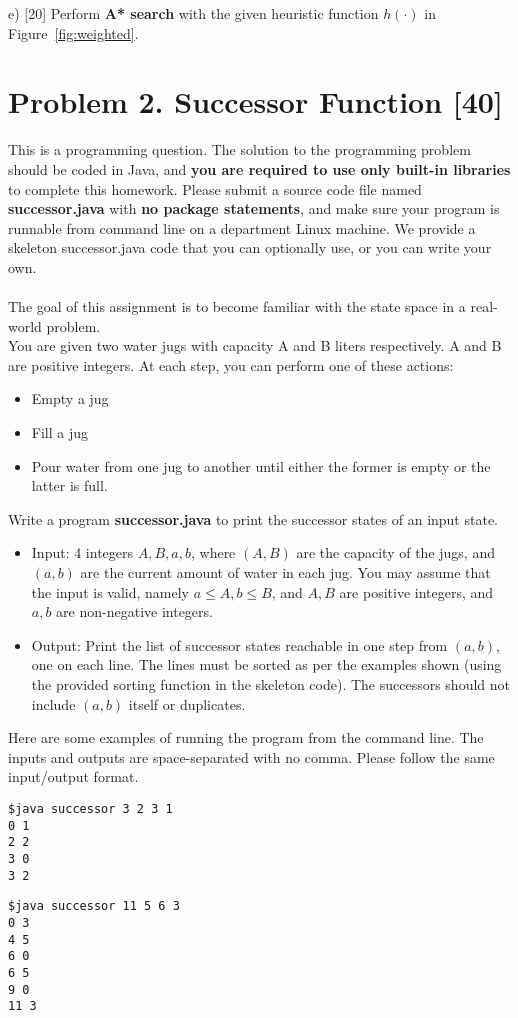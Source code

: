 \documentclass[10pt,a4paper]{article}
\begin{document}
\noindent e) [20] Perform \textbf{A* search} with the given heuristic function $h(\cdot)$ in Figure~\ref{fig:weighted}.


\newpage

\section*{Problem 2. Successor Function [40]}
This is a programming question. The solution to the programming problem should be coded in Java, and
\textbf{you are required to use only built-in libraries} to complete this homework. Please submit a source code file named \textbf{successor.java} with \textbf{no package statements}, and make sure your program is runnable from command line on a department Linux machine. We provide a skeleton successor.java code that you can optionally use, or you can write your own. \\ \\
The goal of this assignment is to become familiar with the state space in a real-world problem. \\
You are given two water jugs with capacity A and B liters respectively. A and B are positive integers. At each step, you can perform one of these actions:
\begin{itemize}
 \setlength{\topsep}{0pt}
 \setlength{\itemsep}{0pt}
 \setlength{\parskip}{0pt}
 \setlength{\parsep}{0pt}
 \item Empty a jug
 \item Fill a jug
 \item Pour water from one jug to another until either the former is empty or the latter is full.
\end{itemize}

\noindent Write a program \textbf{successor.java} to print the successor states of an input state.
\begin{itemize}
 \setlength{\topsep}{0pt}
 \setlength{\itemsep}{0pt}
 \setlength{\parskip}{0pt}
 \setlength{\parsep}{0pt}
 \item Input: 4 integers $A, B, a, b$, where $(A, B)$ are the capacity of the jugs, and $(a, b)$ are the current amount of water in each jug.  You may assume that the input is valid, namely $a\le A, b\le B$, and $A, B$ are positive integers, and $a, b$ are non-negative integers.   
 \item Output: Print the list of successor states reachable in one step from $(a,b)$, one on each line.  The lines must be sorted as per the examples shown (using the provided sorting function in the skeleton code).  The successors should not include $(a,b)$ itself or duplicates.
\end{itemize}

Here are some examples of running the program from the command line.
The inputs and outputs are space-separated with no comma.
Please follow the same input/output format.

\begin{verbatim}
$java successor 3 2 3 1
0 1
2 2
3 0
3 2
\end{verbatim}

\begin{verbatim}
$java successor 11 5 6 3
0 3
4 5
6 0
6 5
9 0
11 3
\end{verbatim}
\end{document}
